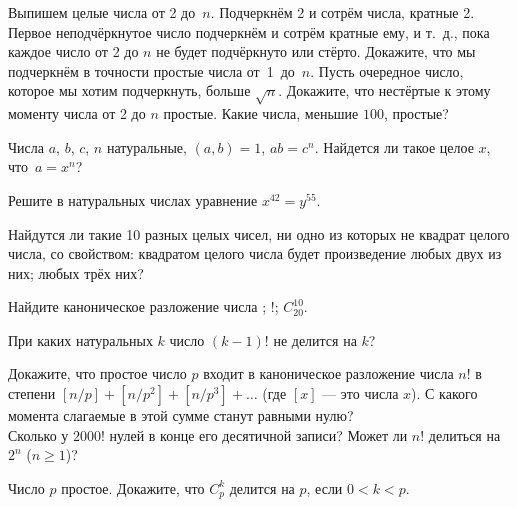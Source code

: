 \documentclass[12pt,a4paper]{article}
\begin{document}



Выпишем целые числа от 2 до~$n$. Подчеркнём
2 и сотрём числа, кратные 2.
Первое неподчёркнутое число подчеркнём и сотрём %
кратные ему, и т.~д.,
пока каждое число от 2 до $n$
не будет подчёркнуто или стёрто.
Докажите, что мы подчеркнём в точности простые числа от~1~до~$n$.
  Пусть очередное число, которое мы хотим подчеркнуть, больше $\sqrt{n}$.
Докажите, что нестёртые к этому моменту числа от 2 до $n$ простые.
 Какие числа, меньшие $100$, простые?

  Числа $a$, $b$, $c$, $n$ натуральные, $(a,b)=1$, $ab=c^n$.
Найдется ли такое целое $x$, что~$a=x^n$?

Решите в натуральных числах уравнение $x^{42}=y^{55}$.

Найдутся ли такие 10 разных целых чисел, ни одно из которых не квадрат целого числа, со свойством: квадратом целого числа будет
произведение
 любых двух из них;
 любых трёх них?


Найдите каноническое разложение числа 
; !;  $C_{20}^{10}$.

При каких натуральных $k$ число $(k-1)!$ не делится на $k$?



 Докажите, что простое число
$p$ входит в каноническое разложение числа $n!$
в степени $[n/p]+[n/p^2]+[n/{p^3}]+\dots$
(где $[x]$ --- это  числа $x$).
С какого момента слагаемые в этой сумме станут равными нулю?\\
 Сколько у $2000!$ нулей в конце его десятичной записи?
 Может ли $n!$ делиться на $2^n$ ($n\geq1$)?



Число $p$ простое. Докажите, что $C_p^k$ делится на
$p$, если $0<k<p$.
\end{document}
